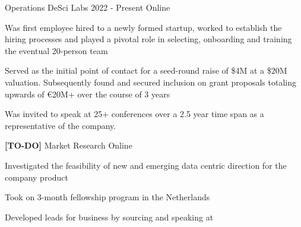
\begin{cventries}

  \cventry
    {Operations} %
    {DeSci Labs} %
    {2022 - Present} %
    {Online} %
    {
      \begin{cvitems} %
        \item {Was first employee hired to a newly formed startup, worked to establish the hiring processes and played a pivotal role in selecting, onboarding and training the eventual 20-person team}
        \item {Served as the initial point of contact for a seed-round raise of \$4M at a \$20M valuation. Subsequently found and secured inclusion on grant proposals totaling upwards of €20M+ over the course of 3 years}
        \item {Was invited to speak at 25+ conferences over a 2.5 year time span as a representative of the company.}
      \end{cvitems}
    }

  \cventry
    {{\bf [TO-DO]} Market Research} %
    {} %
    {} %
    {Online} %
    {
      \begin{cvitems} %
        \item {Investigated the feasibility of new and emerging data centric direction for the company product}
        \item {Took on 3-month fellowship program in the Netherlands}
        \item {Developed leads for business by sourcing and speaking at }
      \end{cvitems}
    }
    

\end{cventries}
